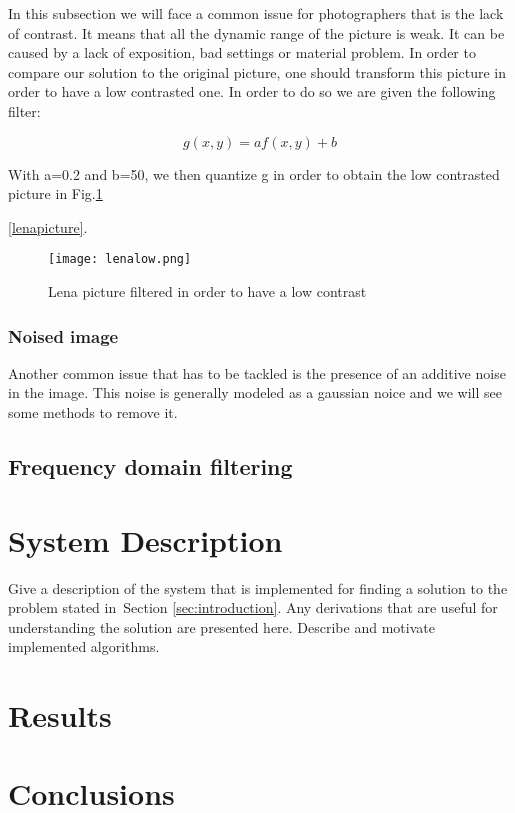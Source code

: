 \documentclass[a4paper]{article}
\begin{document}
In this subsection we will face a common issue for photographers that is the lack of contrast. It means that all the dynamic range of the picture is weak. It can be caused by a lack of exposition, bad settings or material problem. 
In order to compare our solution to the original picture, one should transform this picture in order to have a low contrasted one. In order to do so we are given the following filter:

\begin{equation}
g(x,y)= a f(x,y) + b
\end{equation}

With a=0.2 and b=50, we then quantize g in order to obtain the low contrasted picture in Fig.\ref{fig:lenalow}

\ref{lenapicture}.
\begin{figure}[!ht]
  \centering
  \texttt{[image: lenalow.png]}
  \caption{Lena picture filtered in order to have a low contrast}
  \label{fig:lenalow}
\end{figure}


\subsubsection{Noised image }
Another common issue that has to be tackled is the presence of an additive noise in the image. This noise is generally modeled as a gaussian noice and we will see some methods to remove it. 

\subsection{Frequency domain filtering}



\section{System Description}
\label{sec:system}
Give a description of the system that is implemented for finding a solution to
the problem stated in~Section \ref{sec:introduction}. Any derivations that are
useful for understanding the solution are presented here. Describe and motivate
implemented algorithms.

\section{Results}
\label{sec:results}

\section{Conclusions}
\label{sec:conclusions}
\end{document}
